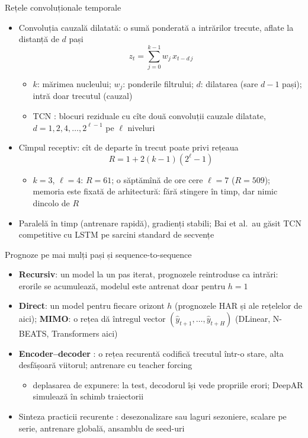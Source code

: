 \begin{frame}{Rețele convoluționale temporale}
\itemsize{\small}
\begin{itemize}
    \item Convoluția cauzală dilatată: o sumă ponderată a intrărilor trecute, aflate la distanță de $d$ pași 
    \[ z_t = \sum_{j=0}^{k-1} w_j\,x_{t - d\,j} \]
    \begin{itemize}
        \item $k$: mărimea nucleului; $w_j$: ponderile filtrului; $d$: dilatarea (sare $d - 1$ pași); intră doar trecutul (cauzal)
        \item TCN : blocuri reziduale cu cîte două convoluții cauzale dilatate, $d = 1, 2, 4, \dots, 2^{\ell-1}$ pe $\ell$ niveluri
    \end{itemize}
    \item Cîmpul receptiv: cît de departe în trecut poate privi rețeaua
    \[ R = 1 + 2(k - 1)(2^\ell - 1) \]
    \begin{itemize}
        \item $k = 3$, $\ell = 4$: $R = 61$; o săptămînă de ore cere $\ell = 7$ ($R = 509$); memoria este fixată de arhitectură: fără stingere în timp, dar nimic dincolo de $R$
    \end{itemize}
    \item Paralelă în timp (antrenare rapidă), gradienți stabili; Bai et al.\ au găsit TCN competitive cu LSTM pe sarcini standard de secvențe
\end{itemize}
\end{frame}

\begin{frame}{Prognoze pe mai mulți pași și sequence-to-sequence}
\itemsize{\small}
\begin{itemize}
    \item \textbf{Recursiv}: un model la un pas iterat, prognozele reintroduse ca intrări: erorile se acumulează, modelul este antrenat doar pentru $h = 1$
    \item \textbf{Direct}: un model pentru fiecare orizont $h$ (prognozele HAR și ale rețelelor de aici); \textbf{MIMO}: o rețea dă întregul vector $(\hat y_{t+1},\dots,\hat y_{t+H})$ (DLinear, N-BEATS, Transformers aici)
    \item \textbf{Encoder--decoder} : o rețea recurentă codifică trecutul într-o stare, alta desfășoară viitorul; antrenare cu teacher forcing
    \begin{itemize}
        \item deplasarea de expunere: la test, decodorul își vede propriile erori; DeepAR simulează în schimb traiectorii
    \end{itemize}
    \item Sinteza practicii recurente : desezonalizare sau laguri sezoniere, scalare pe serie, antrenare globală, ansamblu de seed-uri
\end{itemize}
\end{frame}

